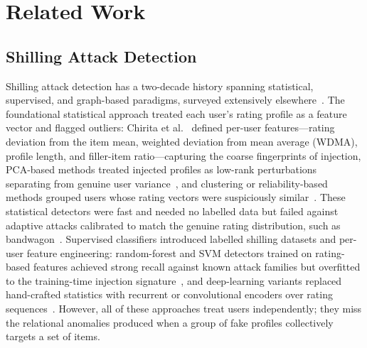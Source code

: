﻿%

\section{Related Work}
\label{sec:related}

\subsection{Shilling Attack Detection}
\label{sec:rel_shilling}

Shilling attack detection has a two-decade history spanning statistical,
supervised, and graph-based paradigms, surveyed extensively
elsewhere~\cite{si2018shilling,sundar2020understanding,zayed2023experimental,nawara2025shilling}.
The foundational statistical approach treated each user's rating profile as a
feature vector and flagged outliers: Chirita et al.~\cite{chirita2005preventing}
defined per-user features—rating deviation from the item mean, weighted
deviation from mean average (WDMA), profile length, and filler-item
ratio—capturing the coarse fingerprints of injection, PCA-based methods
treated injected profiles as low-rank perturbations separating from genuine
user variance~\cite{williams2006detection}, and clustering or reliability-based
methods grouped users whose rating vectors were suspiciously
similar~\cite{mehta2009unsupervised,zhang2020detecting,cai2021bssc,gunes2025beavar,alonso2019robust}.
These statistical detectors were fast and needed no labelled data but failed
against adaptive attacks calibrated to match the genuine rating distribution,
such as bandwagon~\cite{mobasher2007attacks}.
Supervised classifiers introduced labelled shilling datasets and per-user
feature engineering: random-forest and SVM detectors trained on rating-based
features achieved strong recall against known attack families but overfitted
to the training-time injection signature~\cite{burke2005segment,wen2016svmtia,bansal2021shilldetector}, and
deep-learning variants replaced hand-crafted statistics with recurrent or
convolutional encoders over rating
sequences~\cite{wu2021fight,tong2018shilling,vivekanandan2020hybrid,ebrahimian2020detecting,hao2020unsupervised,hao2018detecting,moradi2023detecting}.
However, all of these approaches treat users independently; they miss the
relational anomalies produced when a group of fake profiles collectively
targets a set of items.


